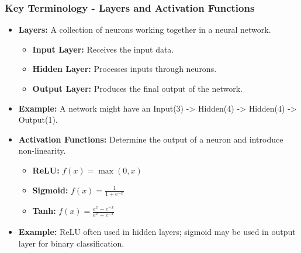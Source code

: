 \documentclass[aspectratio=169]{beamer}
\begin{document}
\begin{frame}[fragile]
    \frametitle{Key Terminology - Layers and Activation Functions}
    \begin{itemize}
        \item \textbf{Layers:} A collection of neurons working together in a neural network.
        \begin{itemize}
            \item \textbf{Input Layer:} Receives the input data.
            \item \textbf{Hidden Layer:} Processes inputs through neurons.
            \item \textbf{Output Layer:} Produces the final output of the network.
        \end{itemize}
        \item \textbf{Example:} A network might have an Input(3) -> Hidden(4) -> Hidden(4) -> Output(1).
    \end{itemize}
    
    \begin{itemize}
        \item \textbf{Activation Functions:} Determine the output of a neuron and introduce non-linearity.
        \begin{itemize}
            \item \textbf{ReLU:} \(f(x) = \max(0, x)\)
            \item \textbf{Sigmoid:} \(f(x) = \frac{1}{1 + e^{-x}}\)
            \item \textbf{Tanh:} \(f(x) = \frac{e^x - e^{-x}}{e^x + e^{-x}}\)
        \end{itemize}
        \item \textbf{Example:} ReLU often used in hidden layers; sigmoid may be used in output layer for binary classification.
    \end{itemize}
\end{frame}
\end{document}
